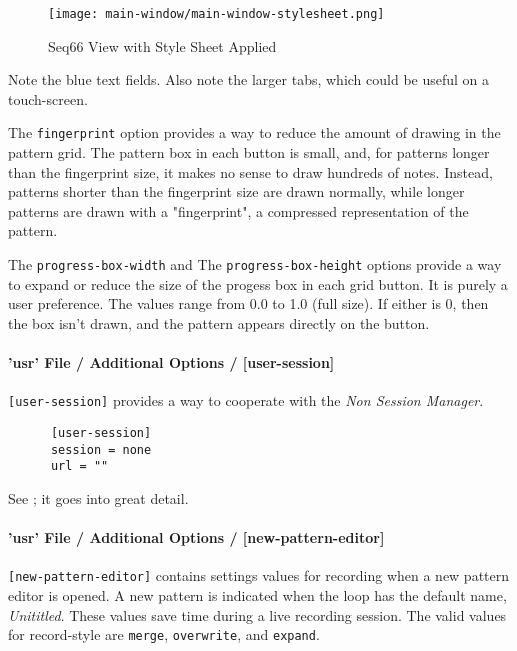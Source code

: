 \begin{figure}[H]
   \centering 
   \texttt{[image: main-window/main-window-stylesheet.png]}
   \caption{Seq66 View with Style Sheet Applied}
   \label{fig:view_with_style_sheet_applied}
\end{figure}

   Note the blue text fields. Also note the larger tabs, which could be useful on
   a touch-screen.

   The \texttt{fingerprint} option provides a way to reduce the amount of
   drawing in the pattern grid.  The pattern box in each button is small, and,
   for patterns longer than the fingerprint size, it makes no sense to draw
   hundreds of notes.  Instead, patterns shorter than the fingerprint size are
   drawn normally, while longer patterns are drawn with a "fingerprint", a
   compressed representation of the pattern.

   The \texttt{progress-box-width} and
   The \texttt{progress-box-height} options provide a way to expand or reduce
   the size of the progess box in each grid button.
   It is purely a user preference.
   The values range from 0.0 to 1.0 (full size).  If either is 0,
   then the box isn't drawn, and the pattern appears directly on the button.

\paragraph{'usr' File / Additional Options / [user-session]}
\label{paragraph:user_file_added_options_session}

   \texttt{[user-session]} provides a way to cooperate with the
   \textsl{Non Session Manager}.

   \begin{verbatim}
      [user-session]
      session = none
      url = ""
   \end{verbatim}

   See ; it goes into great
   detail.

\paragraph{'usr' File / Additional Options / [new-pattern-editor]}
\label{paragraph:user_file_added_options_pattern_editor}

   \texttt{[new-pattern-editor]} contains settings values for recording
	 when a new pattern editor is opened. A new pattern is indicated when
	the loop has the default name, \textsl{Unititled}.
 	These values save time during a live recording session.
   The valid values for record-style are \texttt{merge},
 	\texttt{overwrite}, and \texttt{expand}.

